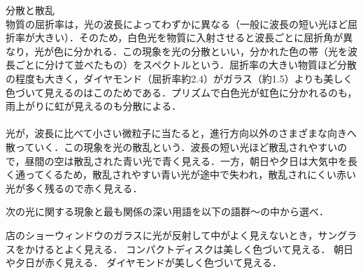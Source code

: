\begin{matome}{分散と散乱}
\hspace{3mm}\hspace{2mm}{\gtfamily 分散}\\
\hspace{5mm}物質の屈折率は，光の波長によってわずかに異なる（一般に{\gtfamily 波長の短い光ほど屈折率が大きい}）．そのため，白色光を物質に入射させると波長ごとに屈折角が異なり，光が色に分かれる．この現象を{\gtfamily 光の分散}といい，分かれた色の帯（光を波長ごとに分けて並べたもの）を{\gtfamily スペクトル}という．屈折率の大きい物質ほど分散の程度も大きく，ダイヤモンド（屈折率約2.4）がガラス（約1.5）よりも美しく色づいて見えるのはこのためである．プリズムで白色光が虹色に分かれるのも，雨上がりに虹が見えるのも分散による．\\[1mm]
\hspace{3mm}\hspace{2mm}{\gtfamily 散乱}\\
\hspace{5mm}光が，波長に比べて小さい微粒子に当たると，進行方向以外のさまざまな向きへ散っていく．この現象を{\gtfamily 光の散乱}という．{\gtfamily 波長の短い光ほど散乱されやすい}ので，昼間の空は散乱された青い光で青く見える．一方，朝日や夕日は大気中を長く通ってくるため，散乱されやすい青い光が途中で失われ，散乱されにくい赤い光が多く残るので赤く見える．
\end{matome}

\newpage

\setcounter{qno}{62}

\filbreak
{}


\hspace{1zw}次の光に関する現象と最も関係の深い用語を以下の語群〜の中から選べ．
\begin{komon}
 店のショーウィンドウのガラスに光が反射して中がよく見えないとき，サングラスをかけるとよく見える．
 コンパクトディスクは美しく色づいて見える．
 朝日や夕日が赤く見える．
 ダイヤモンドが美しく色づいて見える．
\end{komon}
\begin{center}
\end{center}

